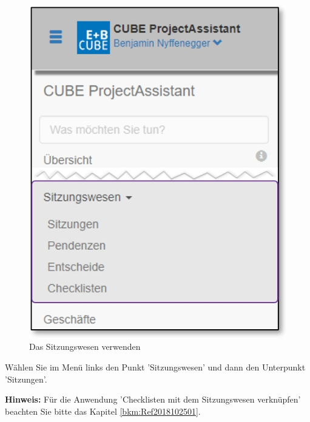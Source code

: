 \begin{figure}   %
  \vspace{-35pt}      %
  \begin{center}
    \includegraphics[width=1\linewidth]{../chapters/05_Sitzungswesen/pictures/5-1_Menu_Sitzungswesen.jpg}
  \end{center}
  \vspace{-20pt}
  \caption{Das Sitzungswesen verwenden}
  \vspace{-10pt}
\end{figure}

Wählen Sie im Menü links den Punkt 'Sitzungswesen' und dann den Unterpunkt 'Sitzungen'.

\vspace{9cm}

\textbf{Hinweis:} Für die Anwendung 'Checklisten mit dem Sitzungswesen verknüpfen' beachten Sie bitte das Kapitel \ref{bkm:Ref2018102501}.

